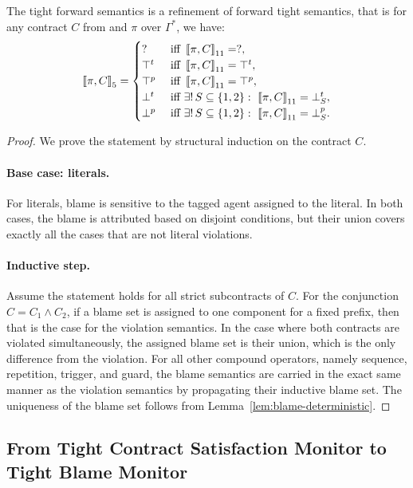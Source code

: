 \begin{theorem}
The tight forward semantics is a refinement of forward tight semantics, that is for any contract $C$ from \cDL and $\pi$ over $\Gamma^*$, we have:
\[
\left\llbracket \pi,C \right\rrbracket_{5}=
\begin{cases}
? & \text{ iff } \left\llbracket \pi,C \right\rrbracket_{11}=?,\\
\top^t & \text{ iff }   \left\llbracket \pi,C \right\rrbracket_{11}=\top^t,\\
\top^p & \text{ iff }  \left\llbracket \pi,C \right\rrbracket_{11}=\top^p,\\
\bot^t & \text{ iff }  \exists!\,S\subseteq \{1,2\}:\ \left\llbracket \pi,C \right\rrbracket_{11}= \mathbin{\bot^{t}_{S}},\\
\bot^p & \text{ iff }  \exists!\,S\subseteq \{1,2\}:\ \left\llbracket \pi,C \right\rrbracket_{11}= \mathbin{\bot^{p}_{S}}.\\
\end{cases}
\]
\end{theorem}



\begin{proof}
    We prove the statement by structural induction on the contract $C$.
\paragraph{Base case: literals.}
For literals, blame is sensitive to the tagged agent assigned to the literal. In both cases, the blame is attributed based on disjoint conditions, but their union covers exactly all the cases that are not literal violations.
\paragraph{Inductive step.}
Assume the statement holds for all strict subcontracts of $C$. 
For the conjunction $C=C_1\wedge C_2$, if a blame set is assigned to one component for a fixed prefix, then that is the case for the violation semantics. In the case where both contracts are violated simultaneously, the assigned blame set is their union, which is the only difference from the violation.
For all other compound operators, namely sequence, repetition, trigger, and guard, the blame semantics are carried in the exact same manner as the violation semantics by propagating their inductive blame set.
The uniqueness of the blame set follows from Lemma~\ref{lem:blame-deterministic}.

\end{proof}

\subsection{From Tight Contract Satisfaction Monitor to Tight Blame Monitor}

